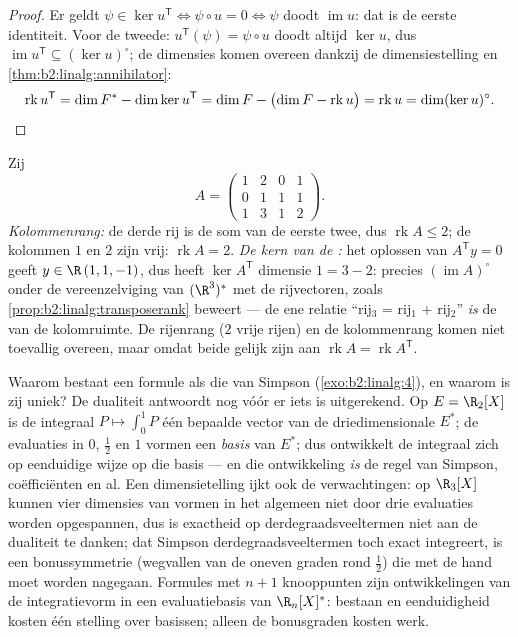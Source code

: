 \begin{proof}
Er geldt $\psi \in \ker u^{\mathsf T} \iff \psi \circ u = 0 \iff
\psi$ doodt $\operatorname{im} u$: dat is de eerste identiteit.
Voor de tweede: $u^{\mathsf T}(\psi) = \psi \circ u$ doodt altijd
$\ker u$, dus $\operatorname{im} u^{\mathsf T} \subseteq (\ker
u)^\circ$; de dimensies komen overeen dankzij de dimensiestelling
en \cref{thm:b2:linalg:annihilator}:
\[
\operatorname{rk} u^{\mathsf T} = \dim F^* - \dim\ker u^{\mathsf T}
= \dim F - \bigl(\dim F - \operatorname{rk} u\bigr)
= \operatorname{rk} u
= \dim (\ker u)^{\circ} . \qedhere
\]
\end{proof}

\begin{example}\label{ex:b2:linalg:rankbothsides}
Zij
\[
A = \begin{pmatrix}
1 & 2 & 0 & 1\\
0 & 1 & 1 & 1\\
1 & 3 & 1 & 2
\end{pmatrix} .
\]
\emph{Kolommenrang:} de derde rij is de som van de eerste twee,
dus $\operatorname{rk} A \leq 2$; de kolommen $1$ en $2$ zijn
vrij: $\operatorname{rk} A = 2$. \emph{De kern van de
:} het oplossen van $A^{\mathsf T}y = 0$ geeft $y
\in \R\,(1, 1, -1)$, dus heeft $\ker A^{\mathsf T}$ dimensie $1 =
3 - 2$: precies $(\operatorname{im} A)^\circ$ onder de
vereenzelviging van $(\R^3)^*$ met de rijvectoren, zoals
\cref{prop:b2:linalg:transposerank} beweert --- de ene relatie
``rij$_3$ = rij$_1$ + rij$_2$'' \emph{is} de  van de
kolomruimte. De rijenrang ($2$ vrije rijen) en de kolommenrang
komen niet toevallig overeen, maar omdat beide gelijk zijn aan
$\operatorname{rk} A = \operatorname{rk} A^{\mathsf T}$.
\end{example}

\begin{example}\label{ex:b2:linalg:quadratureread}
Waarom bestaat een formule als die van Simpson
(\cref{exo:b2:linalg:4}), en waarom is zij uniek? De dualiteit
antwoordt nog vóór er iets is uitgerekend. Op $E = \R_2[X]$ is de
integraal $P \mapsto \int_0^1 P$ één bepaalde vector van de
driedimensionale  $E^*$; de evaluaties in $0$,
$\frac12$ en $1$ vormen een \emph{basis} van $E^*$; dus
ontwikkelt de integraal zich op eenduidige wijze op die basis ---
en die ontwikkeling \emph{is} de regel van Simpson, coëfficiënten
en al. Een dimensietelling ijkt ook de verwachtingen: op
$\R_3[X]$ kunnen vier dimensies van vormen in het algemeen niet
door drie evaluaties worden opgespannen, dus is exactheid op
derdegraadsveeltermen niet aan de dualiteit te danken; dat
Simpson derdegraadsveeltermen toch exact integreert, is een
bonussymmetrie (wegvallen van de oneven graden rond $\frac12$)
die met de hand moet worden nagegaan. Formules met $n + 1$
knooppunten zijn ontwikkelingen van de integratievorm in een
evaluatiebasis van $\R_n[X]^*$: bestaan en eenduidigheid kosten
één stelling over  basissen; alleen de bonusgraden kosten
werk.
\end{example}


